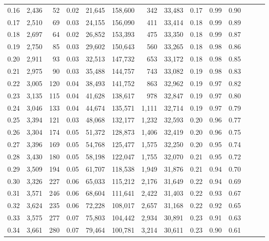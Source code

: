 \begin{tabular}{rrrrrrrrrrrrrr}
0.16 &  2,436 &   52 &  0.02 &   21,645 &  158,600 &     342 &  33,483 &  0.17 &  0.99 &      0.90 \\
0.17 &  2,510 &   69 &  0.03 &   24,155 &  156,090 &     411 &  33,414 &  0.18 &  0.99 &      0.89 \\
0.18 &  2,697 &   64 &  0.02 &   26,852 &  153,393 &     475 &  33,350 &  0.18 &  0.99 &      0.87 \\
0.19 &  2,750 &   85 &  0.03 &   29,602 &  150,643 &     560 &  33,265 &  0.18 &  0.98 &      0.86 \\
0.20 &  2,911 &   93 &  0.03 &   32,513 &  147,732 &     653 &  33,172 &  0.18 &  0.98 &      0.85 \\
0.21 &  2,975 &   90 &  0.03 &   35,488 &  144,757 &     743 &  33,082 &  0.19 &  0.98 &      0.83 \\
0.22 &  3,005 &  120 &  0.04 &   38,493 &  141,752 &     863 &  32,962 &  0.19 &  0.97 &      0.82 \\
0.23 &  3,135 &  115 &  0.04 &   41,628 &  138,617 &     978 &  32,847 &  0.19 &  0.97 &      0.80 \\
0.24 &  3,046 &  133 &  0.04 &   44,674 &  135,571 &   1,111 &  32,714 &  0.19 &  0.97 &      0.79 \\
0.25 &  3,394 &  121 &  0.03 &   48,068 &  132,177 &   1,232 &  32,593 &  0.20 &  0.96 &      0.77 \\
0.26 &  3,304 &  174 &  0.05 &   51,372 &  128,873 &   1,406 &  32,419 &  0.20 &  0.96 &      0.75 \\
0.27 &  3,396 &  169 &  0.05 &   54,768 &  125,477 &   1,575 &  32,250 &  0.20 &  0.95 &      0.74 \\
0.28 &  3,430 &  180 &  0.05 &   58,198 &  122,047 &   1,755 &  32,070 &  0.21 &  0.95 &      0.72 \\
0.29 &  3,509 &  194 &  0.05 &   61,707 &  118,538 &   1,949 &  31,876 &  0.21 &  0.94 &      0.70 \\
0.30 &  3,326 &  227 &  0.06 &   65,033 &  115,212 &   2,176 &  31,649 &  0.22 &  0.94 &      0.69 \\
0.31 &  3,571 &  246 &  0.06 &   68,604 &  111,641 &   2,422 &  31,403 &  0.22 &  0.93 &      0.67 \\
0.32 &  3,624 &  235 &  0.06 &   72,228 &  108,017 &   2,657 &  31,168 &  0.22 &  0.92 &      0.65 \\
0.33 &  3,575 &  277 &  0.07 &   75,803 &  104,442 &   2,934 &  30,891 &  0.23 &  0.91 &      0.63 \\
0.34 &  3,661 &  280 &  0.07 &   79,464 &  100,781 &   3,214 &  30,611 &  0.23 &  0.90 &      0.61 \\

\end{tabular}
